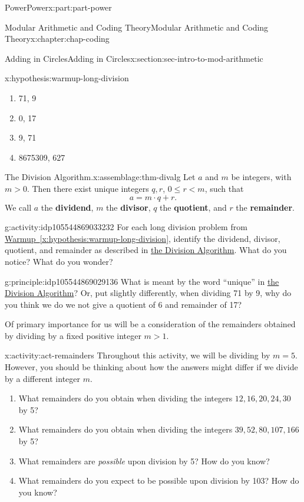 \documentclass[oneside,10pt,]{book}
\newcommand{\xreffont}{\relax}
\newcommand{\terminology}[1]{\textbf{#1}}
\numberwithin{equation}{section}
\renewcommand{\le}{\leqslant}
\newcommand{\lt}{<}
\newcommand{\gt}{>}
\begin{document}
\begin{partptx}{Power}{}{Power}{}{}{x:part:part-power}
\begin{chapterptx}{Modular Arithmetic and Coding Theory}{}{Modular Arithmetic and Coding Theory}{}{}{x:chapter:chap-coding}
\begin{sectionptx}{Adding in Circles}{}{Adding in Circles}{}{}{x:section:sec-intro-to-mod-arithmetic}
\begin{hypothesis}{}{}{x:hypothesis:warmup-long-division}
\begin{enumerate}
\item{}71, 9%
\item{}0, 17%
\item{}9, 71%
\item{}8675309, 627%
\end{enumerate}
\end{hypothesis}
\begin{assemblage}{The Division Algorithm.}{x:assemblage:thm-divalg}%
Let \(a\) and \(m\) be integers, with \(m\gt 0\). Then there exist unique integers \(q,r\), \(0\le r \lt m\), such that%
\begin{equation*}
a = m\cdot q + r.
\end{equation*}
We call \(a\) the \terminology{dividend}, \(m\) the \terminology{divisor}, \(q\) the \terminology{quotient}, and \(r\) the \terminology{remainder}.%
\end{assemblage}
\begin{activity}{}{g:activity:idp105544869033232}%
For each long division problem from \hyperref[x:hypothesis:warmup-long-division]{Warmup~{\xreffont\ref{x:hypothesis:warmup-long-division}}}, identify the dividend, divisor, quotient, and remainder as described in \hyperref[x:assemblage:thm-divalg]{the Division Algorithm}. What do you notice? What do you wonder?%
\end{activity}%
\begin{principle}{}{}{g:principle:idp105544869029136}%
What is meant by the word ``unique'' in \hyperref[x:assemblage:thm-divalg]{the Division Algorithm}? Or, put slightly differently, when dividing 71 by 9, why do you think we do we not give a quotient of 6 and remainder of 17?%
\end{principle}
Of primary importance for us will be a consideration of the remainders obtained by dividing by a fixed positive integer \(m\gt 1\).%
\begin{activity}{}{x:activity:act-remainders}%
Throughout this activity, we will be dividing by \(m = 5\). However, you should be thinking about how the answers might differ if we divide by a different integer \(m\).%
%
\begin{enumerate}
\item{}What remainders do you obtain when dividing the integers \(12, 16, 20, 24, 30\) by 5?%
\item{}What remainders do you obtain when dividing the integers \(39, 52, 80, 107, 166\) by 5?%
\item{}What remainders are \emph{possible} upon division by 5? How do you know?%
\item{}What remainders do you expect to be possible upon division by 103? How do you know?%

\end{enumerate}
\end{activity}
\end{sectionptx}
\end{chapterptx}
\end{partptx}
\end{document}
